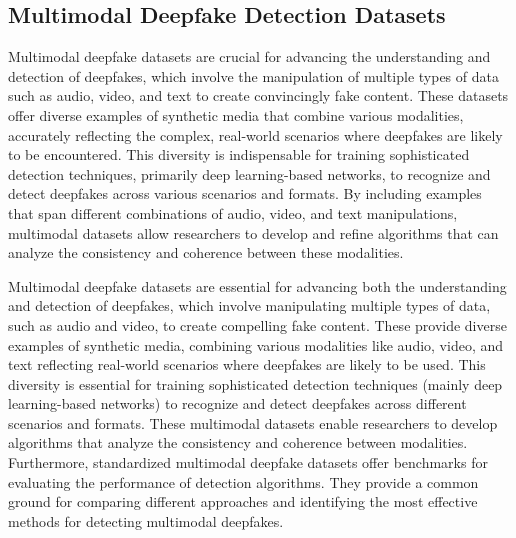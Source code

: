 \subsection{Multimodal Deepfake Detection Datasets}
\label{subsec:multimodal_datasets}

Multimodal deepfake datasets are crucial for advancing the understanding and detection of deepfakes, which involve the manipulation of multiple types of data such as audio, video, and text to create convincingly fake content. These datasets offer diverse examples of synthetic media that combine various modalities, accurately reflecting the complex, real-world scenarios where deepfakes are likely to be encountered. This diversity is indispensable for training sophisticated detection techniques, primarily deep learning-based networks, to recognize and detect deepfakes across various scenarios and formats. By including examples that span different combinations of audio, video, and text manipulations, multimodal datasets allow researchers to develop and refine algorithms that can analyze the consistency and coherence between these modalities.

Multimodal deepfake datasets are essential for advancing both the understanding and detection of deepfakes, which involve manipulating multiple types of data, such as audio and video, to create compelling fake content. These provide diverse examples of synthetic media, combining various modalities like audio, video, and text reflecting real-world scenarios where deepfakes are likely to be used. This diversity is essential for training sophisticated detection techniques (mainly deep learning-based networks) to recognize and detect deepfakes across different scenarios and formats. These multimodal datasets enable researchers to develop algorithms that analyze the consistency and coherence between modalities. Furthermore, standardized multimodal deepfake datasets offer benchmarks for evaluating the performance of detection algorithms. They provide a common ground for comparing different approaches and identifying the most effective methods for detecting multimodal deepfakes.

